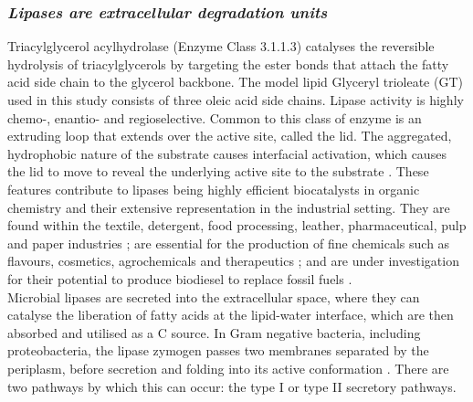 \documentclass[twoside]{article}
\begin{document}

\subsubsection{\emph{Lipases are extracellular degradation units}}
Triacylglycerol acylhydrolase (Enzyme Class 3.1.1.3) catalyses the reversible hydrolysis of triacylglycerols by targeting the ester bonds that attach the fatty acid side chain to the glycerol backbone. The model lipid Glyceryl trioleate (GT) used in this study consists of three oleic acid side chains.
Lipase activity is highly chemo-, enantio- and regioselective. Common to this class of enzyme is an extruding loop that extends over the active site, called the lid. The aggregated, hydrophobic nature of the substrate causes interfacial activation, which causes the lid to move to reveal the underlying active site to the substrate \cite{derewenda1992,van_Tilbeurgh1993}. These features contribute to lipases being highly efficient biocatalysts in organic chemistry and their extensive representation in the industrial setting. 
They are found within the textile, detergent, food processing, leather, pharmaceutical, pulp and paper industries \cite{hasan_06}; are essential for the production of fine chemicals such as flavours, cosmetics, agrochemicals and therapeutics \cite{jaeger2002}; and are under investigation for their potential to produce biodiesel to replace fossil fuels \cite{hasan_06,iso2001}. \\


Microbial lipases are secreted into the extracellular space, where they can catalyse the liberation of fatty acids at the lipid-water interface, which are then absorbed and utilised as a C source. In Gram negative bacteria, including proteobacteria, the lipase zymogen passes two membranes separated by the periplasm, before secretion and folding into its active conformation \cite{bos2007,michel2009}. There are two pathways by which this can occur: the type I or type II secretory pathways. \\
\end{document}

